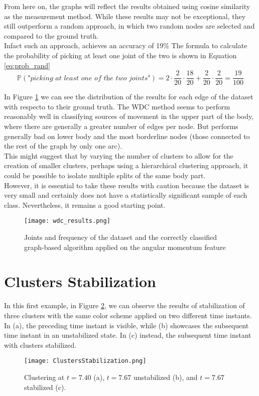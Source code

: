 From here on, the graphs will reflect the results obtained using cosine similarity as the measurement method.
While these results may not be exceptional, they still outperform a random approach, in which two random nodes are selected and compared to the ground truth. \\
Infact such an approach, achieves an accuracy of 19\% 
The formula to calculate the probability of picking at least one joint of the two is shown in Equation \ref{eq:prob_rand}
\begin{equation}
  \mathbb{P}(\textit{"picking at least one of the two joints"}) = 2 \cdot \frac{2}{20} \cdot \frac{18}{20} + \frac{2}{20} \cdot \frac{2}{20} = \frac{19}{100}
  \label{eq:prob_rand}
\end{equation}

In Figure \ref{fig:wdc_results} we can see the distribution of the results for each edge of the dataset with respecto to their ground truth.
The WDC method seems to perform reasonably well in classifying sources of movement in the upper part of the body, where there are generally a greater number of edges per node.
But performs generally bad on lower body and the most borderline nodes (those connected to the rest of the graph by only one arc).\\
This might suggest that by varying the number of clusters to allow for the creation of smaller clusters, perhaps using a hierarchical clustering approach, it could be possible to isolate multiple splits of the same body part.\\ 
However, it is essential to take these results with caution because the dataset is very small and certainly does not have a statistically significant sample of each class. 
Nevertheless, it remains a good starting point. \\

\begin{figure}[H]
  \centering
  \texttt{[image: wdc\_results.png]}
  \caption{Joints and frequency of the dataset and the correctly classified graph-based algorithm applied on the angular momentum feature}
  \label{fig:wdc_results}
\end{figure}

\section{Clusters Stabilization}
In this first example, in Figure \ref{fig:stabilization_results}, we can observe the results of stabilization of three clusters with the same color scheme applied on two different time instants. 
In (a), the preceding time instant is visible, while (b) showcases the subsequent time instant in an unstabilized state. 
In (c) instead, the subsequent time instant with clusters stabilized.
\begin{figure}[H]
  \centering
  \texttt{[image: ClustersStabilization.png]}
  \caption{Clustering at $t=7.40$ (a), $t=7.67$ unstabilized (b), and $t=7.67$ stabilized (c).}
  \label{fig:stabilization_results}
\end{figure}

